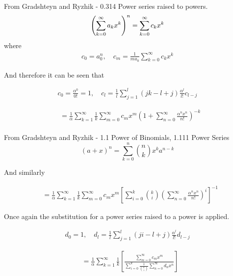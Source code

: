 From Gradshteyn and Ryzhik - 0.314 Power series raised to powers.
\begin{equation}
	\left(\sum\limits_{k=0}^{\infty}a_{k}x^{k}\right)^{n} = \sum\limits_{k=0}^{\infty}c_{k}x^{k} \\
	\label{eqn:power series raised to powers}
\end{equation}
where
\begin{align*}
	c_{0} = a_{0}^{n}, \quad c_{m} = \frac{1}{ma_{0}}\sum\limits_{k=0}^{\infty}c_{k}x^{k}
\end{align*}

And therefore it can be seen that

\begin{align*}
	c_{0} = \frac{\alpha^{0}}{0!}=1, \quad c_{l} = \frac{1}{l}\sum\limits_{j=1}^{l}(jk-l+j)\frac{\alpha^{l}}{l!}c_{l-j}
\end{align*}

\begin{align*}
	& = \frac{1}{\alpha}\sum\limits_{k=1}^{\infty}\frac{1}{k}\sum\limits_{m=0}^{\infty}c_{m}x^{m}\left( 1+\sum\limits_{n=0}^{\infty}\frac{\alpha^{n}x^{n}}{n!}\right)^{-k} \\
\end{align*}

From Gradshteyn and Ryzhik - 1.1 Power of Binomials, 1.111 Power Series 
\begin{equation}
	(a+x)^n = \sum\limits_{k=0}^{n}{n \choose k}x^k a^{n-k}
\end{equation}

And similarly

\begin{align*}
	& = \frac{1}{\alpha}\sum\limits_{k=1}^{\infty}\frac{1}{k}\sum\limits_{m=0}^{\infty}c_mx^m
	\left[ \sum\limits_{i=0}^{k}{k \choose i} \left( \sum\limits_{n=0}^{\infty}\frac{\alpha^nx^n}{n!} \right)^{i} \right]^{-1}
\end{align*}

Once again the substitution for a power series raised to a power is applied.

\begin{align*}
	d_{0} = 1, \quad d_{l}=\frac{1}{l}\sum\limits_{j=1}^{l}(ji-l+j)\frac{\alpha^{l}}{l!}d_{l-j}
\end{align*}

\begin{align*}
	& = \frac{1}{\alpha}\sum\limits_{k=1}^{\infty}\frac{1}{k}\left[ \frac{\sum\limits_{m=0}^{\infty}c_{m}x^{m}}{\sum\limits_{i=0}^{k}\frac{1}{{k \choose i}}\sum\limits_{n=0}^{\infty}d_{n}x^{n}} \right]
\end{align*}

